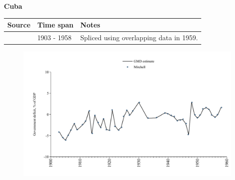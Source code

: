 \documentclass[12pt,a4paper,landscape]{article}
\begin{document}
\begin{adjustbox}{max totalsize={\paperwidth}{\paperheight},center}
\begin{minipage}[t][\textheight][t]{\textwidth}
\vspace*{0.5cm}
{}
\begin{center}
{\Large\bfseries Cuba}
\end{center}
\vspace{0.5cm}
\begin{table}[H]
\centering
\small
\begin{tabular}{|l|l|l|}
\hline
\textbf{Source} & \textbf{Time span} & \textbf{Notes} \\
\hline
\rowcolor{white}\cite{Mitchell}& 1903 - 1958 &Spliced using overlapping data in 1959.\\
\hline
\end{tabular}
\end{table}
\begin{figure}[H]
\centering
\includegraphics[width=\textwidth,height=0.6\textheight,keepaspectratio]{graphs/CUB_govdef_GDP.pdf}
\end{figure}
\end{minipage}
\end{adjustbox}
\end{document}
